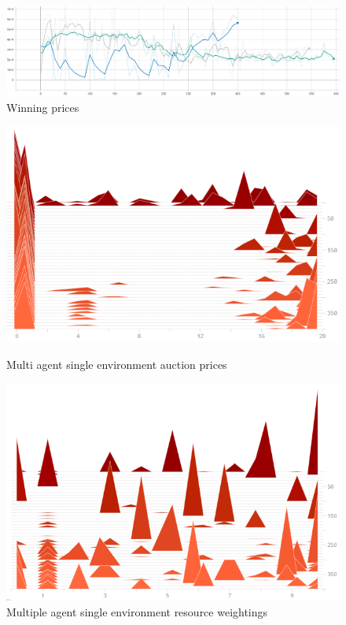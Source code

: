 \begin{figure}[h]
    \centering
    \includegraphics[width=15cm]{figures/env_training_fig/total_winning_prices.PNG}
    \caption{Winning prices}
    \label{fig:env_winning_prices}
\end{figure}

\begin{figure}[h]
    \centering
    \begin{minipage}{0.5\textwidth}
        \centering
        \includegraphics[width=1.0\textwidth]{figures/env_training_fig/multi_agent_single_env_auction_price.png}
        \caption{Multi agent single environment auction prices}
        \label{fig:multi_agent_single_env_auction_prices}
    \end{minipage}\hfill
    \begin{minipage}{0.5\textwidth}
        \centering
        \includegraphics[width=1.0\textwidth]{figures/env_training_fig/multi_agents_single_env_weightings.png}
        \caption{Multiple agent single environment resource weightings}
        \label{fig:multi_agent_single_env_weightings}
    \end{minipage}
\end{figure}

